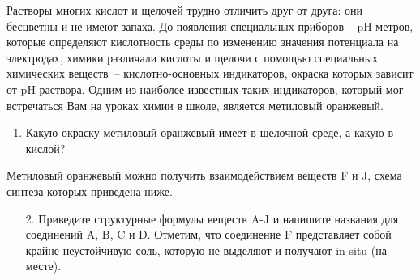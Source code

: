 
Растворы многих кислот и щелочей трудно отличить друг от друга: они бесцветны и не имеют запаха. 
До появления специальных приборов – pH-метров, которые определяют кислотность среды по изменению 
значения потенциала на электродах, химики различали кислоты и щелочи с помощью специальных химических веществ~– кислотно-основных индикаторов, окраска которых зависит от pH раствора. Одним из наиболее известных таких индикаторов, который мог встречаться Вам на уроках химии в школе, является метиловый оранжевый.

\begin{enumerate}
    \item Какую окраску метиловый оранжевый имеет в щелочной среде, а какую в кислой?   
\end{enumerate}

Метиловый оранжевый можно получить взаимодействием веществ F и J, схема синтеза которых приведена ниже.

\begin{enumerate}
    \item[2.] Приведите структурные формулы веществ A-J и напишите названия для соединений A, B, C и D. Отметим, 
    что соединение F представляет собой  крайне неустойчивую соль, которую не выделяют и получают in 
    situ (на месте).
\end{enumerate}

